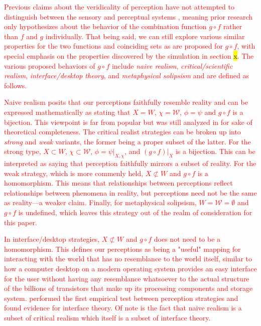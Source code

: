 \documentclass{article}[10pt]
\begin{document}
\textcolor{red}{Previous claims about the veridicality of perception have not attempted to distinguish between the sensory and perceptual systems \cite{mark2010natural}, meaning prior research only hypothesizes about the behavior of the combination function $g \circ f$ rather than $f$ and $g$ individually.  
That being said, we can still explore various similar properties for the two functions and coinciding sets as are proposed for $g \circ f$, with special emphasis on the properties discovered by the simulation in section  \hl{x}.  
The various proposed behaviors of $g \circ f$ include {\it naive realism},  {\it critical/scientific realism}, {\it interface/desktop theory}, and {\it metaphysical solipsism} and are defined as follows.}  \par 
\textcolor{red}{Naive realism posits that our perceptions faithfully resemble reality and can be expressed mathematically as stating that $X=W$, $\chi= \mathcal{W}$,  $\phi = \psi$ and $g \circ f$ is a bijection.  
This viewpoint is far from popular but was still analyzed in  for sake of theoretical completeness.  
The critical realist strategies can be broken up into {\it strong} and {\it weak} variants, the former being a proper subset of the latter. 
For the strong type, $X \subset W$, $\chi \subset \mathcal{W}$, $\phi = \psi |_{X,\chi}$, and $(g \circ f) |_X$ is a bijection.  
This can be interpreted as saying that perception faithfully mirrors a subset of reality.  
For the weak strategy, which is more commenly held,  $X \not\subset W$ and $g \circ f$ is a homomorphism. 
This means that relationships between perceptions reflect relationships between phenomena in reality, but perceptions need not be the same as reality---a weaker claim.  
Finally, for metaphysical solipsism, $W=\mathcal{W}=\emptyset$ and $g\circ f$ is undefined, which leaves this strategy out of the realm of consideration for this paper.}  \par 


\textcolor{red}{In interface/desktop strategies, $X\not\subset W$ and $g\circ f$ does not need to be a homomorphism.  
This defines our perceptions as being a "useful" mapping for interacting with the world that has no resemblance to the world itself, similar to how a computer desktop on a modern operating system provides an easy interface for the user without having any resemblance whatsoever to the actual structure of the billions of transistors that make up its processing components and storage system. 
\citeauthor{mark2010natural} performed the first empirical test between perception strategies and found evidence for interface theory. 
Of note is the fact that naive realism is a subset of critical realism which itself is a subset of interface theory.} \par 
\end{document}
